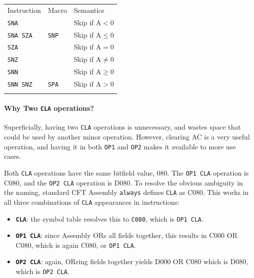 \documentclass[11pt,a4paper,twocolumns]{article}
\newcommand\hex[1]{\textsf{#1}}
\newcommand\register[1]{\textsf{#1}}
\newcommand\A{\register{AC}}
\begin{document}
\vspace{1em}\noindent\begin{center}
\begin{tabular}{lll}
  Instruction & Macro & Semantics \\\noalign{\smallskip}\hline\noalign{\smallskip}
  {\tt SNA }     &           & Skip if $\mbox{A} < 0$ \\
  {\tt SNA SZA } & {\tt SNP} & Skip if $\mbox{A} \leq 0$ \\
  {\tt SZA }     &           & Skip if $\mbox{A} = 0$ \\
  {\tt SNZ }     &           & Skip if $\mbox{A} \not= 0$ \\
  {\tt SNN }     &           & Skip if $\mbox{A} \geq 0$ \\
  {\tt SNN SNZ } & {\tt SPA} & Skip if $\mbox{A} > 0$ \\
  \noalign{\smallskip}\hline\noalign{\smallskip}
\end{tabular}
\end{center}\vspace{1em}

\paragraph{Why Two {\tt CLA} operations?}
\label{sec-cla2}
Superficially, having two {\tt CLA} operations is unnecessary, and wastes
space that could be used by another minor operation. However, clearing
\A{} is a very useful operation, and having it in both {\tt OP1} and
  {\tt OP2} makes it available to more use cases.

Both {\tt CLA} operations have the same bitfield value, \hex{080}. The
{\tt OP1 CLA} operation is \hex{C080}, and the {\tt OP2 CLA} operation
is \hex{D080}. To resolve the obvious ambiguity in the naming,
standard CFT Assembly {\tt always\/} defines {\tt CLA} as
\hex{C080}. This works in all three combinations of {\tt CLA}
appearances in instructions:

\begin{itemize}
\item{\textbf{\tt CLA}:} the symbol table resolves this to {\tt C080},
  which is {\tt OP1 CLA}.
\item{\textbf{\tt OP1 CLA}:} since Assembly ORs all fields together,
  this results in \hex{C000 OR C080}, which is again \hex{C080}, or
  {\tt OP1 CLA}.
\item{\textbf{\tt OP2 CLA}:} again, ORring fields together yields
  \hex{D000 OR C080} which is \hex{D080}, which is {\tt OP2 CLA}.
\end{itemize}
\end{document}
